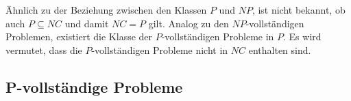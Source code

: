 Ähnlich zu der Beziehung zwischen den Klassen $P$ und $NP$, ist nicht bekannt,
ob auch $P \subseteq NC$ und damit $NC = P$ gilt.
Analog zu den $NP$-vollständigen Problemen, existiert die Klasse der $P$-vollständigen Probleme in $P$.
Es wird vermutet, dass die $P$-vollständigen Probleme nicht in $NC$ enthalten sind.
\cite[S.535]{jaja}

\subsection{P-vollständige Probleme}
